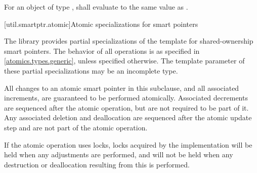 \begin{itemdescr}
\pnum
For an object  of type ,
 shall evaluate to
the same value as .
\end{itemdescr}%

%
[util.smartptr.atomic]{Atomic specializations for smart pointers}

\pnum
The library provides partial specializations of the  template
for shared-ownership smart pointers.
The behavior of all operations is as specified in \ref{atomics.types.generic},
unless specified otherwise.
The template parameter  of these partial specializations
may be an incomplete type.

\pnum
All changes to an atomic smart pointer in this subclause, and
all associated  increments,
are guaranteed to be performed atomically.
Associated  decrements
are sequenced after the atomic operation,
but are not required to be part of it.
Any associated deletion and deallocation
are sequenced after the atomic update step and
are not part of the atomic operation.
\begin{note}
If the atomic operation uses locks,
locks acquired by the implementation
will be held when any  adjustments are performed, and
will not be held when any destruction or deallocation
resulting from this is performed.
\end{note}

